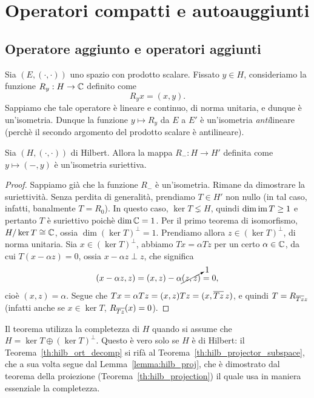 \chapter{Operatori compatti e autoauggiunti}

\section{Operatore aggiunto e operatori aggiunti}
Sia $(E, (\cdot, \cdot))$ uno spazio con prodotto scalare.
Fissato $y \in H$, consideriamo la funzione $R_y : H \to \mathbb{C}$ definito come
\begin{equation*}
	R_y x = (x,y).
\end{equation*}
Sappiamo che tale operatore è lineare e continuo, di norma unitaria, e dunque è un'isometria. Dunque la funzione $y \mapsto R_y$ da $E$ a $E'$ è un'isometria \emph{anti}lineare (perchè il secondo argomento del prodotto scalare è antilineare).

\begin{theorem}
\label{eq:ops_riesz}
	Sia $(H, (\cdot,\cdot))$ di Hilbert.
	Allora la mappa $R_-: H \to H'$ definita come $y \mapsto (-, y)$ è un'isometria suriettiva.
\end{theorem}
\begin{proof}
	Sappiamo già che la funzione $R_-$ è un'isometria. Rimane da dimostrare la suriettività.
	Senza perdita di generalità, prendiamo $T \in H'$ non nullo (in tal caso, infatti, banalmente $T=R_0$).
	In questo caso, $\ker T \lneq H$, quindi $\dim \operatorname{im} T \geq 1$ e pertanto $T$ è suriettivo poichè $\dim \mathbb{C} = 1$.
	Per il primo teorema di isomorfismo, $H/\ker T \overset{}{\cong} \mathbb{C}$, ossia $\dim(\ker T)^\perp = 1$.
	Prendiamo allora $z \in (\ker T)^\perp$, di norma unitaria.
	Sia $x \in (\ker T)^\perp$, abbiamo $Tx = \alpha Tz$ per un certo $\alpha \in \mathbb{C}$, da cui $T(x-\alpha z) = 0$, ossia $x-\alpha z \perp z$, che significa
	\begin{equation*}
		(x-\alpha z, z) = (x,z) - \alpha \cancelto{1}{(z,z)} = 0,
	\end{equation*}
	cioè $(x,z) = \alpha$. Segue che $Tx = \alpha Tz = (x,z)Tz = (x, \overline{Tz}\, z)$, e quindi $T = R_{\overline{Tz} z}$ (infatti anche se $x \in \ker T$, $R_{\overline{Tz} }(x) = 0$).
\end{proof}

\begin{remark}
	Il teorema utilizza la completezza di $H$ quando si assume che ${H = \ker T \oplus (\ker T)^\perp}$. Questo è vero solo se $H$ è di Hilbert: il Teorema~\ref{th:hilb_ort_decomp} si rifà al Teorema~\ref{th:hilb_projector_subspace}, che a sua volta segue dal Lemma~\ref{lemma:hilb_proj}, che è dimostrato dal teorema della proiezione (Teorema~\ref{th:hilb_projection}) il quale usa in maniera essenziale la completezza.
\end{remark}

